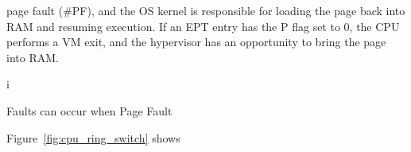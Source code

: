page fault (\#PF), and the OS kernel is responsible for loading the page back
into RAM and resuming execution. If an EPT entry has the P flag set to 0, the
CPU performs a VM exit, and the hypervisor has an opportunity to bring the page
into RAM.

i

Faults can occur when
Page Fault

Figure~\ref{fig:cpu_ring_switch} shows




